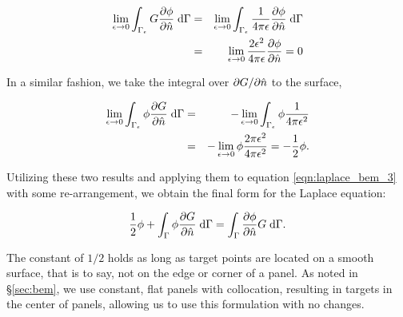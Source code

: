 \begin{eqnarray}
	\lim_{\epsilon\to0} \int_{\Gamma_\epsilon} G\frac{\partial \phi}{\partial \hat{n}}\;\text{d}\Gamma & = & \lim_{\epsilon\to0}\int_{\Gamma_\epsilon} \frac{1}{4\pi\epsilon}\frac{\partial \phi}{\partial \hat{n}}\;\text{d}\Gamma \\
	& = & \lim_{\epsilon\to0}\frac{2\epsilon^{2}}{4\pi\epsilon} \frac{\partial \phi}{\partial \hat{n}} = 0
\end{eqnarray}

In a similar fashion, we take the integral over $\partial G / \partial \hat{n}$ to the surface,

\begin{eqnarray}
	\lim_{\epsilon\to0} \int_{\Gamma_\epsilon} \phi\frac{\partial G}{\partial \hat{n}}\;\text{d}\Gamma & = & -\lim_{\epsilon\to0} \int_{\Gamma_\epsilon} \phi\frac{1}{4\pi\epsilon^{2}} \\
	& = & -\lim_{\epsilon\to0} \phi\frac{2\pi\epsilon^{2}}{4\pi\epsilon^{2}} = -\frac{1}{2}\phi.
\end{eqnarray}

Utilizing these two results and applying them to equation \ref{eqn:laplace_bem_3} with some re-arrangement, we obtain the final form for the Laplace equation:

\begin{equation}\label{eqn:laplace_bem_final}
	\frac{1}{2}\phi + \int_{\Gamma} \phi\partiald{G}{\nhat}\;\di{\Gamma} = \int_{\Gamma}\partiald{\phi}{\nhat}G\;\di{\Gamma}.
\end{equation}

The constant of $1/2$ holds as long as target points are located on a smooth surface, that is to say, not on the edge or corner of a panel. As noted in \S\ref{sec:bem}, we use constant, flat panels with collocation, resulting in targets in the center of panels, allowing us to use this formulation with no changes.

